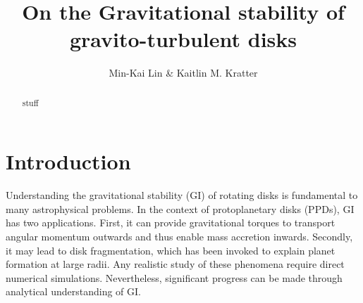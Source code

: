 \documentclass[iop, numberedappendix]{emulateapj}
\begin{document}
\title{On the Gravitational stability of gravito-turbulent disks}
\author{Min-Kai Lin \& Kaitlin M. Kratter}

\begin{abstract}
stuff
\end{abstract}

\section{Introduction}\label{intro}














Understanding the gravitational stability (GI) of rotating disks   
is fundamental to many astrophysical problems. In the context of 
protoplanetary disks (PPDs), GI has two applications. First, it can
provide gravitational torques to transport angular momentum outwards
and thus enable mass accretion inwards. Secondly, it may lead to disk
fragmentation, which has been invoked to explain planet formation at
large radii. Any realistic study of these phenomena require direct
numerical simulations. Nevertheless, significant progress can be
made through analytical understanding of GI.  %
\end{document}
